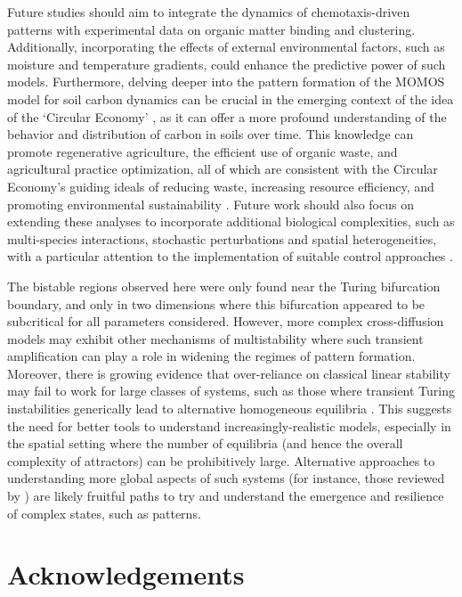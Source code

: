 \documentclass{article}
\begin{document}
{Future studies should aim to integrate the dynamics of chemotaxis-driven patterns with experimental data on organic matter binding and clustering. Additionally, incorporating the effects of external environmental factors, such as moisture and temperature gradients, could enhance the predictive power of such models. 
 Furthermore, delving deeper into the pattern formation of the MOMOS model for soil carbon dynamics can be crucial in the emerging context of the idea of the `Circular Economy' \cite{Yin_2023}, as it can offer a more profound understanding of the behavior and distribution of carbon in soils over time. This knowledge can promote regenerative agriculture, the efficient use of organic waste, and agricultural practice optimization, all of which are consistent with the Circular Economy's guiding ideals of reducing waste, increasing resource efficiency, and promoting environmental sustainability \cite{Wang_2024,Nwaogu_2025}.  Future work should also focus on extending these analyses to incorporate additional biological complexities, such as multi-species interactions, stochastic perturbations and spatial heterogeneities, with a particular attention to the implementation of suitable control approaches \cite{Mehdaoui_2024,Mehdaoui_2025}. 

 The bistable regions observed here were only found near the Turing bifurcation boundary, and only in two dimensions where this bifurcation appeared to be subcritical for all parameters considered. However, more complex cross-diffusion models may exhibit other mechanisms of multistability where such transient amplification can play a role in widening the regimes of pattern formation. Moreover, there is growing evidence that over-reliance on classical linear stability may fail to work for large classes of systems, such as those where transient Turing instabilities generically lead to alternative homogeneous equilibria \cite{krause2024turing}. This suggests the need for better tools to understand increasingly-realistic models, especially in the spatial setting where the number of equilibria (and hence the overall complexity of attractors) can be prohibitively large. Alternative approaches to understanding more global aspects of such systems (for instance, those reviewed by \cite{krakovska2024resilience}) are likely fruitful paths to try and understand the emergence and resilience of complex states, such as patterns. 
 
\section*{Acknowledgements}

}
\end{document}
